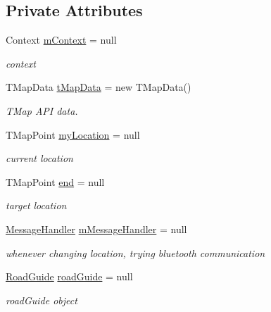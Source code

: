 \subsection*{Private Attributes}
\begin{DoxyCompactItemize}
\item 
Context \mbox{\hyperlink{classhi_1_1world_1_1hello_1_1myapplication_1_1_gps_service_a287f4b761534fdf1c46fe4eb14f62ca6}{m\+Context}} = null
\begin{DoxyCompactList}\small\item\em context \end{DoxyCompactList}\item 
T\+Map\+Data \mbox{\hyperlink{classhi_1_1world_1_1hello_1_1myapplication_1_1_gps_service_af93324bb934aa30328cf998153d91bec}{t\+Map\+Data}} = new T\+Map\+Data()
\begin{DoxyCompactList}\small\item\em T\+Map A\+PI data. \end{DoxyCompactList}\item 
T\+Map\+Point \mbox{\hyperlink{classhi_1_1world_1_1hello_1_1myapplication_1_1_gps_service_af2635a5ffa3c883e90ba210c828a10f4}{my\+Location}} = null
\begin{DoxyCompactList}\small\item\em current location \end{DoxyCompactList}\item 
T\+Map\+Point \mbox{\hyperlink{classhi_1_1world_1_1hello_1_1myapplication_1_1_gps_service_ab8307961992e8c685182bbcaf643960f}{end}} = null
\begin{DoxyCompactList}\small\item\em target location \end{DoxyCompactList}\item 
\mbox{\hyperlink{classhi_1_1world_1_1hello_1_1myapplication_1_1_message_handler}{Message\+Handler}} \mbox{\hyperlink{classhi_1_1world_1_1hello_1_1myapplication_1_1_gps_service_ac8f9736807f14bf24d2a78dc018f84ba}{m\+Message\+Handler}} = null
\begin{DoxyCompactList}\small\item\em whenever changing location, trying bluetooth communication \end{DoxyCompactList}\item 
\mbox{\hyperlink{classhi_1_1world_1_1hello_1_1myapplication_1_1_road_guide}{Road\+Guide}} \mbox{\hyperlink{classhi_1_1world_1_1hello_1_1myapplication_1_1_gps_service_aefb6a2894c429e421d54a98aa6d41da3}{road\+Guide}} = null
\begin{DoxyCompactList}\small\item\em road\+Guide object \end{DoxyCompactList}\end{DoxyCompactItemize}
